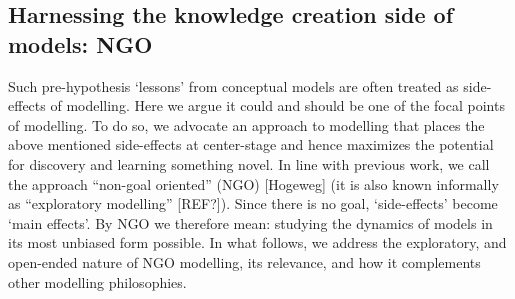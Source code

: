 \subsection{Harnessing the knowledge creation side of models: NGO}

Such pre-hypothesis `lessons' from conceptual models are often treated as side-effects of modelling.  Here we argue it could and should be one of the focal points of modelling. To do so, we advocate an approach to modelling that places the above mentioned side-effects at center-stage and hence maximizes the potential for discovery and learning something novel. In line with previous work, we call the approach ``non-goal oriented'' (NGO) [Hogeweg] (it is also known informally as ``exploratory modelling'' [REF?]). Since there is no goal, `side-effects' become `main effects'.  By NGO we therefore mean: studying the dynamics of models in its most unbiased form possible. In what follows, we address the exploratory, and open-ended nature of NGO modelling, its relevance, and how it complements other modelling philosophies.

  
